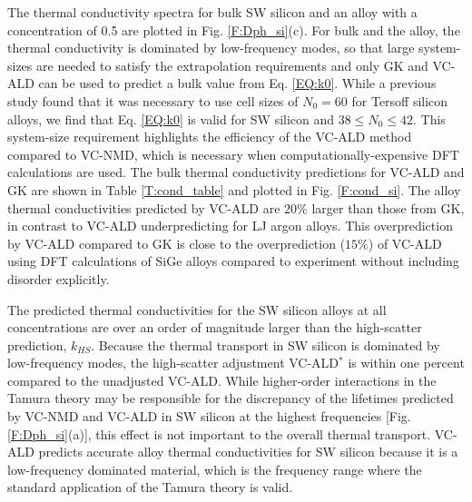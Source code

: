 The thermal conductivity spectra for bulk SW silicon and an alloy 
with a concentration of 0.5 are plotted in Fig. \ref{F:Dph_si}(c). 
For bulk and the alloy, the thermal conductivity is dominated by 
low-frequency modes, so that large system-sizes are needed to satisfy 
the extrapolation requirements and only GK and VC-ALD can be used to 
predict a bulk value from Eq. \eqref{EQ:k0}. While a previous 
study found that it was necessary to use cell sizes of $N_0 = 60$ for Tersoff silicon 
alloys,\cite{he_morphology_2011} we find that  
Eq. \eqref{EQ:k0} is valid for SW silicon and $38 \le N_0 \le 42$. 
This system-size requirement highlights the efficiency of the 
VC-ALD method compared to VC-NMD, which is necessary when 
computationally-expensive DFT calculations are used.
\cite{esfarjani_method_2008,garg_role_2011,tian_phonon_2012,lindsay_thermal_2012,esfarjani_heat_2011,chaput_phonon-phonon_2011}
The bulk thermal conductivity 
predictions for VC-ALD and GK are shown in Table \ref{T:cond_table} and 
plotted in Fig. \ref{F:cond_si}. The alloy thermal conductivities predicted 
by VC-ALD are $20\%$ larger than those from GK, in contrast to VC-ALD 
underpredicting for LJ argon alloys. This overprediction 
by VC-ALD compared to GK is close to the overprediction ($15\%$) of VC-ALD 
using DFT calculations of SiGe alloys compared to experiment 
without including disorder explicitly.\cite{garg_role_2011} 

The predicted thermal conductivities for the SW silicon alloys at 
all concentrations are over an order of magnitude larger than
the high-scatter prediction, $k_{HS}$. 
Because the thermal transport in SW silicon 
is dominated by low-frequency modes, the high-scatter adjustment  
VC-ALD$^*$ is within one percent compared 
to the unadjusted VC-ALD. 
While higher-order interactions in the Tamura theory 
may be responsible for the 
discrepancy of the lifetimes predicted by VC-NMD and VC-ALD in SW silicon 
at the highest frequencies [Fig. \ref{F:Dph_si}(a)],  
this effect is not important to the overall
thermal transport. VC-ALD predicts accurate alloy thermal 
conductivities for SW silicon because it is a low-frequency 
dominated material, which is the frequency range where the standard 
application of the Tamura theory is valid.\cite{tamura_isotope_1983} 

